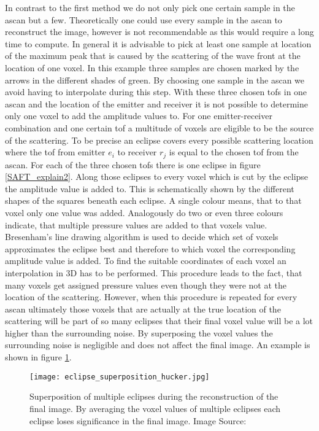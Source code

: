 In contrast to the first method we do not only pick one certain sample in the \ac{ascan} but a few. 
Theoretically one could use every sample in the \ac{ascan} to reconstruct the image, however is not recommendable as this would require a long time to compute. In general it is advisable to pick at least one sample at location of the maximum peak that is caused by the scattering of the wave front at the location of one voxel. In this example three samples are chosen marked by the arrows in the different shades of green. By choosing one sample in the \ac{ascan} we avoid having to interpolate during this step.
With these three chosen \acp{tof} in one \ac{ascan} and the location of the emitter and receiver it is not possible to determine only one voxel to add the amplitude values to. For one emitter-receiver combination and one certain \ac{tof} a multitude of voxels are eligible to be the source of the scattering. To be precise an eclipse covers every possible scattering location where the \ac{tof} from emitter $e_i$ to receiver $r_j$ is equal to the chosen \ac{tof} from the \ac{ascan}. For each of the three chosen \acp{tof} there is one eclipse in figure \ref{SAFT_explain2}. Along those eclipses to every voxel which is cut by the eclipse the amplitude value is added to. This is schematically shown by the different shapes of the squares beneath each eclipse. A single colour means, that to that voxel only one value was added. Analogously do two or even three colours indicate, that multiple pressure values are added to that voxels value. 
Bresenham's line drawing algorithm \cite{Bresenham2010AlgorithmPlotter} is used to decide which set of voxels approximates the eclipse best and therefore to which voxel the corresponding amplitude value is added. To find the suitable coordinates of each voxel an interpolation in 3D has to be performed.
This procedure leads to the fact, that many voxels get assigned pressure values even though they were not at the location of the scattering. However, when this procedure is repeated for every \ac{ascan} ultimately those voxels that are actually at the true location of the scattering will be part of so many eclipses that their final voxel value will be a lot higher than the surrounding noise. By superposing the voxel values the surrounding noise is negligible and does not affect the final image. An example is shown in figure \ref{eclipse_super}.


\begin{figure}[H]
    \centering
    \texttt{[image: eclipse\_superposition\_hucker.jpg]}
    \caption{ Superposition of multiple eclipses during the reconstruction of the final image. By averaging the voxel values of multiple eclipses each eclipse loses significance in the final image.
    Image Source: \cite{PatrickHucker2014EvaluationRuckstreumodells}}
    \label{eclipse_super}
\end{figure}


